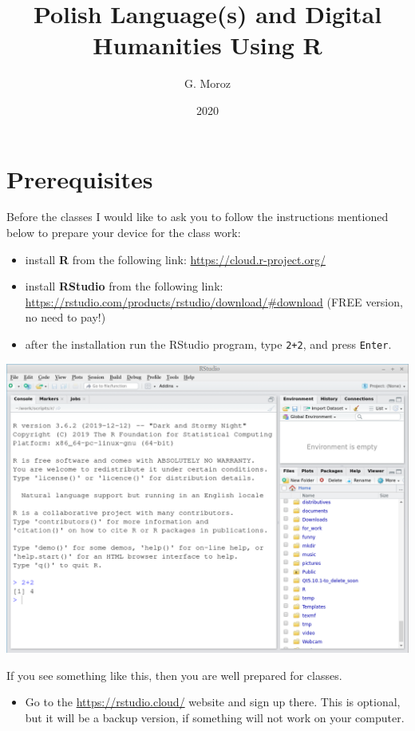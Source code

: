 \documentclass[
]{book}
\title{Polish Language(s) and Digital Humanities Using R}
\author{G. Moroz}
\date{2020}
\providecommand{\tightlist}{%
  \setlength{\itemsep}{0pt}\setlength{\parskip}{0pt}}
\begin{document}
\frontmatter
\maketitle

{
\setcounter{tocdepth}{1}
\tableofcontents
}
\mainmatter
\hypertarget{prerequisites}{%
\chapter{Prerequisites}\label{prerequisites}}

Before the classes I would like to ask you to follow the instructions mentioned below to prepare your device for the class work:

\begin{itemize}
\tightlist
\item
  install \textbf{R} from the following link: \url{https://cloud.r-project.org/}
\item
  install \textbf{RStudio} from the following link: \url{https://rstudio.com/products/rstudio/download/\#download} (FREE version, no need to pay!)
\item
  after the installation run the RStudio program, type \texttt{2+2}, and press \texttt{Enter}.
\end{itemize}

\includegraphics{images/00.rstudio-view.png}

If you see something like this, then you are well prepared for classes.

\begin{itemize}
\tightlist
\item
  Go to the \url{https://rstudio.cloud/} website and sign up there. This is optional, but it will be a backup version, if something will not work on your computer.
\end{itemize}
\end{document}
